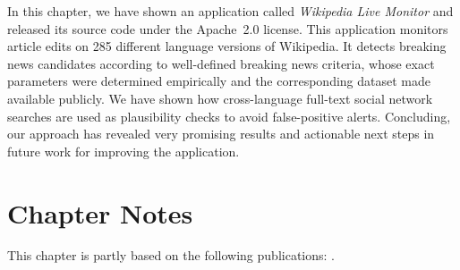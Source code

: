 In this chapter, we have shown an application called \emph{Wikipedia Live Monitor}
and released its source code under the Apache~2.0 license.
This application monitors article edits on 285 different language versions of Wikipedia.
It detects breaking news candidates according to well-defined breaking news criteria,
whose exact parameters were determined empirically
and the corresponding dataset made available publicly.
We have shown how cross-language full-text social network searches are used
as plausibility checks to avoid false-positive alerts.
Concluding, our approach has revealed very promising results
and actionable next steps in future work
for improving the application.

\section*{Chapter Notes}
This chapter is partly based on the following publications:
\cite{steiner2013mj,steiner2011crowdsourcingevent}.


\clearpage


